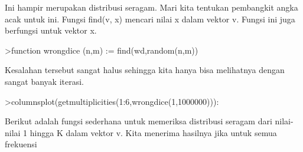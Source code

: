 \documentclass[a4paper,10pt]{article}
\begin{document}
\begin{eulernotebook}
\begin{eulercomment}
Ini hampir merupakan distribusi seragam. Mari kita tentukan pembangkit
angka acak untuk ini. Fungsi find(v, x) mencari nilai x dalam vektor
v. Fungsi ini juga berfungsi untuk vektor x.
\end{eulercomment}
\begin{eulerprompt}
>function wrongdice (n,m) := find(wd,random(n,m))
\end{eulerprompt}
\begin{eulercomment}
Kesalahan tersebut sangat halus sehingga kita hanya bisa melihatnya
dengan sangat banyak iterasi.
\end{eulercomment}
\begin{eulerprompt}
>columnsplot(getmultiplicities(1:6,wrongdice(1,1000000))):
\end{eulerprompt}
\begin{eulercomment}
Berikut adalah fungsi sederhana untuk memeriksa distribusi seragam
dari nilai-nilai 1 hingga K dalam vektor v. Kita menerima hasilnya
jika untuk semua frekuensi


\end{eulercomment}
\end{eulernotebook}
\end{document}
